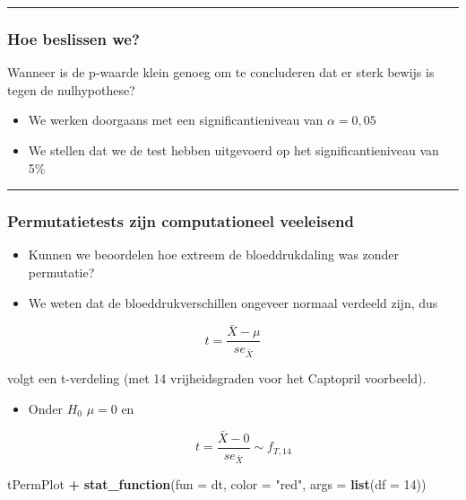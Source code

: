 \documentclass[
  12pt,dutch]{book}
\newenvironment{Shaded}{\begin{snugshade}}{\end{snugshade}}
\newcommand{\AttributeTok}[1]{\textcolor[rgb]{0.13,0.29,0.53}{#1}}
\newcommand{\DecValTok}[1]{\textcolor[rgb]{0.00,0.00,0.81}{#1}}
\newcommand{\FunctionTok}[1]{\textcolor[rgb]{0.13,0.29,0.53}{\textbf{#1}}}
\newcommand{\NormalTok}[1]{#1}
\newcommand{\SpecialCharTok}[1]{\textcolor[rgb]{0.81,0.36,0.00}{\textbf{#1}}}
\newcommand{\StringTok}[1]{\textcolor[rgb]{0.31,0.60,0.02}{#1}}
\theoremstyle{definition}
\theoremstyle{definition}
\theoremstyle{definition}
\theoremstyle{definition}
\theoremstyle{remark}
\begin{document}
\begin{center}\rule{0.5\linewidth}{0.5pt}\end{center}

\subsubsection{Hoe beslissen we?}\label{hoe-beslissen-we}

Wanneer is de p-waarde klein genoeg om te concluderen dat er sterk bewijs is tegen de nulhypothese?

\begin{itemize}
\item
  We werken doorgaans met een significantieniveau van \(\alpha = 0,05\)
\item
  We stellen dat we de test hebben uitgevoerd op het significantieniveau van 5\%
\end{itemize}

\begin{center}\rule{0.5\linewidth}{0.5pt}\end{center}

\subsubsection{Permutatietests zijn computationeel veeleisend}\label{permutatietests-zijn-computationeel-veeleisend}

\begin{itemize}
\item
  Kunnen we beoordelen hoe extreem de bloeddrukdaling was zonder permutatie?
\item
  We weten dat de bloeddrukverschillen ongeveer normaal verdeeld zijn, dus
\end{itemize}

\[t=\frac{\bar X - \mu}{se_{\bar X}}\]

volgt een t-verdeling (met 14 vrijheidsgraden voor het Captopril voorbeeld).

\begin{itemize}
\item
  Onder \(H_0\) \(\mu=0\) en

  \[t=\frac{\bar X-0}{se_{\bar X}}\sim f_{T,14}\]
\end{itemize}

\begin{Shaded}
\begin{Highlighting}[]
\NormalTok{tPermPlot }\SpecialCharTok{+} \FunctionTok{stat\_function}\NormalTok{(}\AttributeTok{fun =}\NormalTok{ dt, }\AttributeTok{color =} \StringTok{"red"}\NormalTok{,}
    \AttributeTok{args =} \FunctionTok{list}\NormalTok{(}\AttributeTok{df =} \DecValTok{14}\NormalTok{))}
\end{Highlighting}
\end{Shaded}
\end{document}

